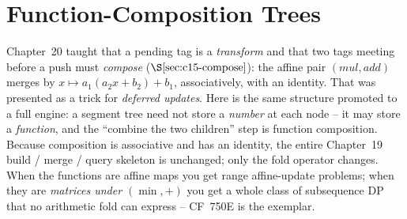 \section{Function-Composition Trees}\label{sec:c29-func}

\begin{previouslybox}
Chapter~20 taught that a pending tag is a \emph{transform} and that two tags
meeting before a push must \emph{compose} (\(\secref{c15-compose}\)): the
affine pair \((\mathit{mul},\mathit{add})\) merges by \(x\mapsto a_1(a_2x+b_2)+b_1\),
associatively, with an identity.  That was presented as a trick for \emph{deferred
updates}.  Here is the same structure promoted to a full engine: a segment tree
need not store a \emph{number} at each node -- it may store a \emph{function},
and the ``combine the two children'' step is function composition.  Because
composition is associative and has an identity, the entire Chapter~19 build /
merge / query skeleton is unchanged; only the fold operator changes.  When the
functions are affine maps you get range affine-update problems; when they are
\emph{matrices under \((\min,+)\)} you get a whole class of subsequence DP that
no arithmetic fold can express -- CF~750E is the exemplar.
\end{previouslybox}

